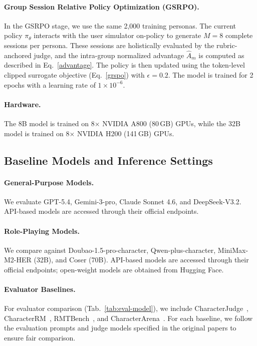 \paragraph{Group Session Relative Policy Optimization (GSRPO).}
In the GSRPO stage, we use the same 2{,}000 training personas. The current policy $\pi_\theta$ interacts with the user simulator on-policy to generate $M=8$ complete sessions per persona. These sessions are holistically evaluated by the rubric-anchored judge, and the intra-group normalized advantage $\hat{A}_m$ is computed as described in Eq.~\ref{advantage}. The policy is then updated using the token-level clipped surrogate objective (Eq.~\ref{grspo}) with $\epsilon = 0.2$. The model is trained for 2 epochs with a learning rate of $1 \times 10^{-6}$.

\paragraph{Hardware.}
The 8B model is trained on 8$\times$ NVIDIA A800 (80\,GB) GPUs, while the 32B model is trained on 8$\times$ NVIDIA H200 (141\,GB) GPUs.


\subsection{Baseline Models and Inference Settings}
\label{app:baseline_models}


\paragraph{General-Purpose Models.}
We evaluate GPT-5.4, Gemini-3-pro, Claude Sonnet 4.6, and DeepSeek-V3.2. API-based models are accessed through their official endpoints.

\paragraph{Role-Playing Models.}
We compare against Doubao-1.5-pro-character, Qwen-plus-character, MiniMax-M2-HER (32B), and Coser (70B). API-based models are accessed through their official endpoints; open-weight models are obtained from Hugging Face.

\paragraph{Evaluator Baselines.}
For evaluator comparison (Tab.~\ref{tab:eval-model}), we include CharacterJudge~\citep{zhou2025characterbench}, CharacterRM~\citep{tu-etal-2024-charactereval}, RMTBench~\citep{xiang-etal-2025-rmtbench}, and CharacterArena~\citep{ye-etal-2025-cpo}. For each baseline, we follow the evaluation prompts and judge models specified in the original papers to ensure fair comparison.


